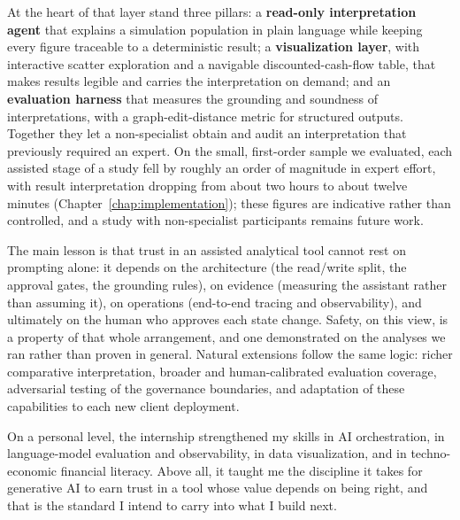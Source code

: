 At the heart of that layer stand three pillars: a
\textbf{read-only interpretation agent} that explains a simulation population in
plain language while keeping every figure traceable to a deterministic result; a
\textbf{visualization layer}, with interactive scatter exploration and a navigable
discounted-cash-flow table, that makes results legible and carries the
interpretation on demand; and an \textbf{evaluation harness} that measures the
grounding and soundness of interpretations, with a graph-edit-distance metric for
structured outputs. Together they let a non-specialist obtain and audit an
interpretation that previously required an expert. On the small, first-order sample
we evaluated, each assisted stage of a study fell by roughly an order of magnitude
in expert effort, with result interpretation dropping from about two hours to about
twelve minutes (Chapter~\ref{chap:implementation}); these figures are indicative
rather than controlled, and a study with non-specialist participants remains future
work.

The main lesson is that trust in an assisted analytical tool cannot rest on
prompting alone: it depends on the architecture (the read/write split, the approval
gates, the grounding rules), on evidence (measuring the assistant rather than
assuming it), on operations (end-to-end tracing and observability), and ultimately
on the human who approves each state change. Safety, on this view, is a property of
that whole arrangement, and one demonstrated on the analyses we ran rather than
proven in general. Natural extensions follow the same logic: richer comparative
interpretation, broader and human-calibrated evaluation coverage, adversarial
testing of the governance boundaries, and adaptation of these capabilities to each
new client deployment.

On a personal level, the internship strengthened my skills in AI orchestration,
in language-model evaluation and observability, in data visualization, and in
techno-economic financial literacy. Above all, it taught me the discipline it
takes for generative AI to earn trust in a tool whose value depends on being
right, and that is the standard I intend to carry into what I build next.
